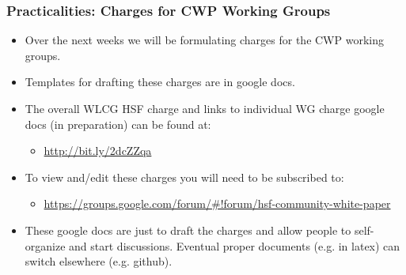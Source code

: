 \begin{frame}
\frametitle{Practicalities: Charges for CWP Working Groups}


\begin{itemize} 
\item Over the next weeks we will be formulating charges for the CWP working groups.
\item Templates for drafting these charges are in google docs.
\item The overall WLCG HSF charge and links to individual WG charge google docs (in preparation) can be found at:
   \begin{itemize}
   \item {\color{blue} \url{http://bit.ly/2dcZZqa}}
   \end{itemize}
\item To view and/edit these charges you will need to be subscribed to:
   \begin{itemize}
   \item {\color{blue} \url{https://groups.google.com/forum/\#!forum/hsf-community-white-paper}}
   \end{itemize}
\item These google docs are just to draft the charges and allow people to self-organize and start discussions. Eventual proper documents (e.g. in latex) can switch elsewhere (e.g. github).
\end{itemize} 

\end{frame}



